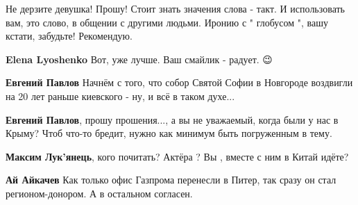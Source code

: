 \begin{itemize}
\begin{itemize}
Не дерзите девушка! Прошу! Стоит знать значения слова - такт. И использовать
вам, это слово, в общении с другими людьми. Иронию с " глобусом ", вашу кстати,
забудьте! Рекомендую.


 
\textbf{Elena Lyoshenko}
Вот, уже лучше. Ваш смайлик - радует. 😉

 
\textbf{Евгений Павлов} Начнём с того, что собор Святой Софии в Новгороде воздвигли на 20 лет раньше киевского - ну, и всё в таком духе...

 
\textbf{Евгений Павлов}, прошу прошения..., а вы не уважаемый, когда были у нас в Крыму? Чтоб что-то бредит, нужно как минимум быть погруженным в тему.

 
\textbf{Максим Лук'янець}, кого почитать? Актёра ? Вы , вместе с ним в Китай идёте?

 
\textbf{Ай Айкачев} Как только офис Газпрома перенесли в Питер, так сразу он стал регионом-донором. А в остальном согласен.

 

\end{itemize}
\end{itemize}
